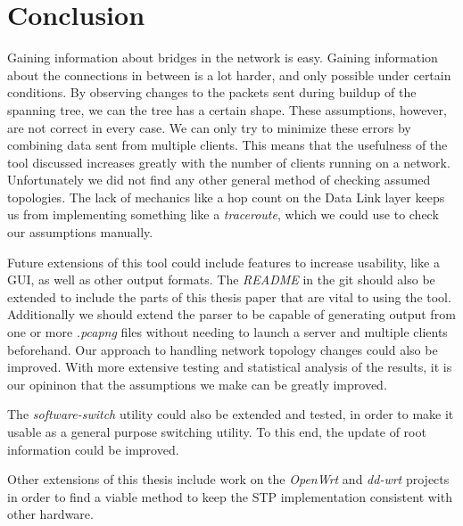 \chapter{Conclusion}
Gaining information about bridges in the network is easy.
Gaining information about the connections in between is a lot harder, and only possible under certain conditions.
By observing changes to the packets sent during buildup of the spanning tree, we can the tree has a certain shape.
These assumptions, however, are not correct in every case.
We can only try to minimize these errors by combining data sent from multiple clients.
This means that the usefulness of the tool discussed increases greatly with the number of clients running on a network.
Unfortunately we did not find any other general method of checking assumed topologies.
The lack of mechanics like a hop count on the Data Link layer keeps us from implementing something like a \textit{traceroute}, which we could use to check our assumptions manually.

Future extensions of this tool could include features to increase usability, like a GUI, as well as other output formats.
The \textit{README} in the git should also be extended to include the parts of this thesis paper that are vital to using the tool.
Additionally we should extend the parser to be capable of generating output from one or more \textit{.pcapng} files without needing to launch a server and multiple clients beforehand.
Our approach to handling network topology changes could also be improved.
With more extensive testing and statistical analysis of the results, it is our opininon that the assumptions we make can be greatly improved.

The \textit{software-switch} utility could also be extended and tested, in order to make it usable as a general purpose switching utility.
To this end, the update of root information could be improved.

Other extensions of this thesis include work on the \textit{OpenWrt} and \textit{dd-wrt} projects in order to find a viable method to keep the STP implementation consistent with other hardware.
